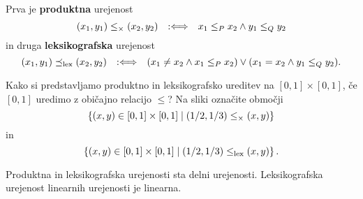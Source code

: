 Prva je \textbf{produktna} urejenost
%
\begin{equation*}
  (x_1,y_1) \leq_{\times} (x_2,y_2) \quad {{:}{\Longleftrightarrow}}\quad x_1 \leq_P x_2 \land y_1 \leq_Q y_2
\end{equation*}
%
in druga \textbf{leksikografska} urejenost
%
\begin{equation*}
  (x_1,y_1) \preceq_\mathrm{lex} (x_2,y_2)
  \quad {{:}{\Longleftrightarrow}}\quad (x_1 \neq x_2 \land x_1 \leq_P x_2) \lor (x_1 = x_2 \land y_1 \leq_Q y_2).
\end{equation*}


\begin{naloga}
  Kako si predstavljamo produktno in leksikografsko ureditev na $[0,1] \times [0,1]$, če $[0,1]$ uredimo z običajno relacijo $\leq$? Na sliki označite območji
  \begin{equation*}
    \left\{(x,y) \in [0,1] \times [0, 1] \; \middle| \; (1/2,1/3) \leq_\times (x,y)\right\}
  \end{equation*}
  in
  \begin{equation*}
    \left\{(x,y) \in [0,1] \times [0, 1] \; \middle| \; (1/2,1/3) \leq_\mathrm{lex} (x,y)\right\}.
  \end{equation*}
\end{naloga}

\begin{izjava}
  Produktna in leksikografska urejenosti sta delni urejenosti. Leksikografska urejenost linearnih urejenosti je linearna.
\end{izjava}

